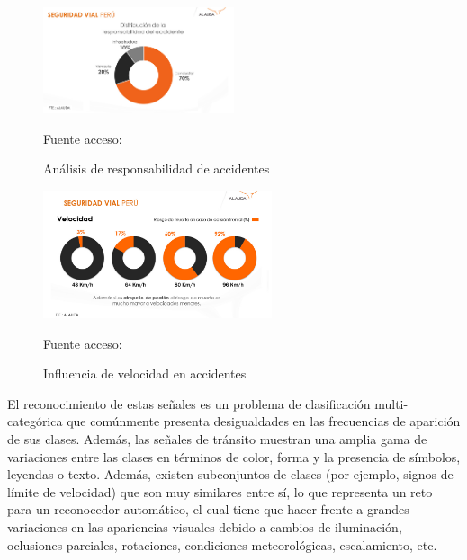 	\begin{figure}[H]
	\begin{center}
	\includegraphics[width=0.5\textwidth]{images/intro/responsabilidad_cond}
	\end{center}
	\begin{center}
	\caption{\small{Análisis de responsabilidad de accidentes}}
	{\small{Fuente acceso: \cite{Gestion1}}}
	\end{center}
	\vspace{-1.5em}
	\end{figure}

	\begin{figure}[H]
	\begin{center}
	\includegraphics[width=0.6\textwidth]{images/intro/velocidad_ind}
	\end{center}
	\begin{center}
	\caption{\small{Influencia de velocidad en accidentes}}
	{\small{Fuente acceso: \cite{Gestion1}}}
	\end{center}
	\vspace{-1.5em}
	\end{figure}
	
	
	El reconocimiento de estas señales es un problema de clasificación multi-categórica que comúnmente presenta desigualdades en las frecuencias de aparición de sus clases. Además, las señales de tránsito muestran una amplia gama de variaciones entre las clases en términos de color, forma y la presencia de símbolos, leyendas o texto. Además, existen subconjuntos de clases (por ejemplo, signos de límite de velocidad) que son muy similares entre sí, lo que representa un reto para un reconocedor  automático, el cual tiene que hacer frente a grandes variaciones en las apariencias visuales debido a cambios de iluminación, oclusiones parciales, rotaciones, condiciones meteorológicas, escalamiento, etc.
    


